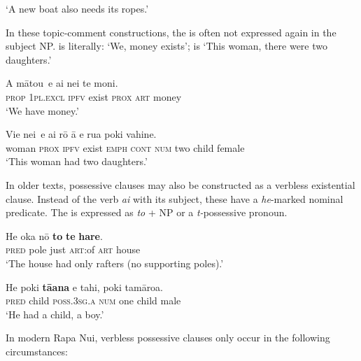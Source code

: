 \glt
‘A new boat also needs its ropes.’ \textstyleExampleref{[R200.083]} 
\z

In these topic-comment constructions, the  is often not expressed again in the subject NP.  is literally: ‘We, money exists’;  is ‘This woman, there were two daughters.’

\ea\label{ex:9.75}
\gll {\ob}A mātou\,{\cb} e ai nei te moni. \\
{\db}\textsc{prop} \textsc{1pl.excl} \textsc{ipfv} exist \textsc{prox} \textsc{art} money \\

\glt 
‘We have money.’ \textstyleExampleref{[R621.027]} 
\z

\ea\label{ex:9.76}
\gll {\ob}Vi{\ꞌ}e nei\,{\cb} e ai rō {\ꞌ}ā e rua poki vahine. \\
{\db}woman \textsc{prox} \textsc{ipfv} exist \textsc{emph} \textsc{cont} \textsc{num} two child female \\

\glt 
‘This woman had two daughters.’ \textstyleExampleref{[R491.008]} 
\z

In older texts, possessive clauses may also be constructed as a verbless existential clause. Instead of the verb \textit{ai} with its subject, these have a \textit{he}-marked nominal predicate. The  is expressed as \textit{to} + NP or a \textit{t-}possessive pronoun. 

\ea\label{ex:9.77}
\gll He {\ꞌ}oka nō \textbf{to} \textbf{te} \textbf{hare}. \\
\textsc{pred} pole just \textsc{art}:of \textsc{art} house \\

\glt 
‘The house had only rafters (no supporting poles).’ \textstyleExampleref{[Ley-2-12.007]}
\z

\ea\label{ex:9.78}
\gll He poki \textbf{tā{\ꞌ}ana} e tahi, poki tamāroa. \\
\textsc{pred} child \textsc{poss.3sg.a} \textsc{num} one child male \\

\glt
‘He had a child, a boy.’ \textstyleExampleref{[Ley-9-56.002]}
\z

In modern Rapa Nui, verbless possessive clauses only occur in the following circumstances:

